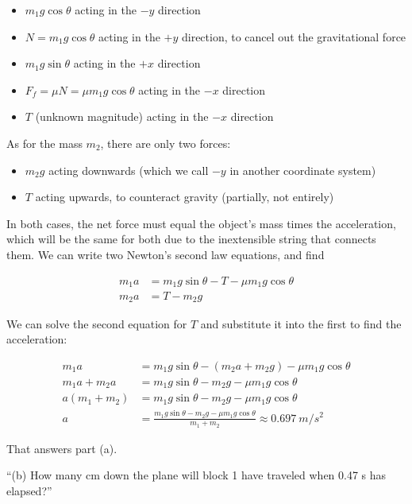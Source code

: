 \documentclass[12pt,a4paper]{report}
\begin{document}
\begin{itemize}
\item $m_1 g \cos \theta$ acting in the $-y$ direction
\item $N = m_1 g \cos \theta$ acting in the $+y$ direction, to cancel out the gravitational force
\item $m_1 g \sin \theta$ acting in the $+x$ direction
\item $F_f = \mu N = \mu m_1 g \cos \theta$ acting in the $-x$ direction
\item $T$ (unknown magnitude) acting in the $-x$ direction
\end{itemize}

As for the mass $m_2$, there are only two forces:

\begin{itemize}
\item $m_2 g$ acting downwards (which we call $-y$ in another coordinate system)
\item $T$ acting upwards, to counteract gravity (partially, not entirely)
\end{itemize}

In both cases, the net force must equal the object's mass times the acceleration, which will be the same for both due to the inextensible string that connects them. We can write two Newton's second law equations, and find

\begin{align}
m_1 a &= m_1 g \sin \theta - T - \mu m_1 g \cos \theta\\
m_2 a &= T - m_2 g
\end{align}

We can solve the second equation for $T$ and substitute it into the first to find the acceleration:

\begin{align}
m_1 a &= m_1 g \sin \theta - (m_2 a + m_2 g) - \mu m_1 g \cos \theta\\
m_1 a + m_2 a &= m_1 g \sin \theta - m_2 g - \mu m_1 g \cos \theta\\
a(m_1 + m_2) &= m_1 g \sin \theta - m_2 g - \mu m_1 g \cos \theta\\
a &= \frac{m_1 g \sin \theta - m_2 g - \mu m_1 g \cos \theta}{m_1 + m_2} \approx \SI{0.697}{m/s^2}
\end{align}

That answers part (a).

``(b) How many cm down the plane will block 1 have traveled when 0.47 s has elapsed?''
\end{document}

